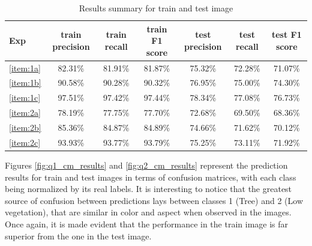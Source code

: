 \documentclass[10pt, a4paper]{article}
\begin{document}
\begin{table}[htpb]
  \centering
  \begin{tabular}{l|c|c|c|c|c|c|}
    Exp             &	train precision	& train recall	& train F1 score  &	test precision  & test recall	& test F1 score \\
    \hline
    \ref{item:1a}   & 82.31\%         & 81.91\%       & 81.87\%         & 75.32\%         & 72.28\%     & 71.07\%       \\
    \ref{item:1b}   & 90.58\%         & 90.28\%       & 90.32\%         & 76.95\%         & 75.00\%     & 74.30\%       \\
    \ref{item:1c}   & 97.51\%         & 97.42\%       & 97.44\%         & 78.34\%         & 77.08\%     & 76.73\%       \\
    \ref{item:2a}   & 78.19\%         & 77.75\%       & 77.70\%         & 72.68\%         & 69.50\%     & 68.36\%       \\
    \ref{item:2b}   & 85.36\%         & 84.87\%       & 84.89\%         & 74.66\%         & 71.62\%     & 70.12\%       \\
    \ref{item:2c}   & 93.93\%         & 93.77\%       & 93.79\%         & 75.25\%         & 73.11\%     & 71.92\%       \\
    \hline
  \end{tabular}
  \caption{Results summary for train and test image}
  \label{tab:img_results_summ}
\end{table}

Figures \ref{fig:q1_cm_results} and \ref{fig:q2_cm_results} represent the prediction results for train and test images in terms of confusion matrices, with each 
class being normalized by its real labels. It is interesting to notice that the greatest source of confusion between predictions lays between classes 1 (Tree) and 
2 (Low vegetation), that are similar in color and aspect when observed in the images. Once again, it is made evident that the performance in the train image is 
far superior from the one in the test image.
\end{document}
